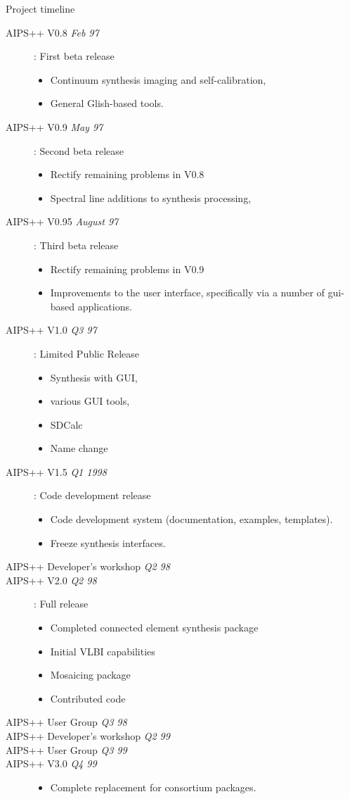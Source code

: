 \begin{slide}{Project timeline}
\begin{description}
\item[AIPS++ V0.8 {\em Feb 97}]: First beta release
\begin{itemize}
\item Continuum synthesis imaging and self-calibration,
\item General Glish-based tools.
\end{itemize}
\item[AIPS++ V0.9 {\em May 97}]: Second beta release
\begin{itemize}
\item Rectify remaining problems in V0.8
\item Spectral line additions to synthesis processing,
\end{itemize}
\item[AIPS++ V0.95 {\em August 97}]: Third beta release
\begin{itemize}
\item Rectify remaining problems in V0.9
\item Improvements to the user interface, specifically via a number of
gui-based applications.
\end{itemize}
\item[AIPS++ V1.0 {\em Q3 97}]: Limited Public Release
\begin{itemize}
\item Synthesis with GUI, 
\item various GUI tools,
\item SDCalc
\item Name change
\end{itemize}
\item[AIPS++ V1.5 {\em Q1 1998}]: Code development release
\begin{itemize}
\item Code development system (documentation, examples, templates). 
\item Freeze synthesis interfaces.
\end{itemize}
\item[AIPS++ Developer's workshop {\em Q2 98}]
\item[AIPS++ V2.0 {\em Q2 98}]: Full release
\begin{itemize}
\item Completed connected element synthesis package
\item Initial VLBI capabilities
\item Mosaicing package
\item Contributed code
\end{itemize}
\item[AIPS++ User Group {\em Q3 98}]
\item[AIPS++ Developer's workshop {\em Q2 99}]
\item[AIPS++ User Group {\em Q3 99}]
\item[AIPS++ V3.0 {\em Q4 99}]
\begin{itemize}
\item Complete replacement for consortium packages.
\end{itemize}
\end{description}
\end{slide}

